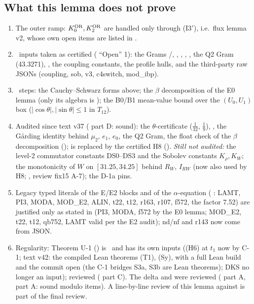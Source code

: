 \documentclass[11pt]{article}
\begin{document}
\subsection{What this lemma does not prove}\label{EI:sec:open}
\begin{enumerate}[leftmargin=*]
\item The outer ramp: $K_0^{\mathrm{OR}},K_2^{\mathrm{OR}}$ are handled only through (I3$'$), i.e.\ flux lemma v2, whose own open items are listed in .
\item \tR\ inputs taken as certified ( ``Open'' 1): the Grams /, , , , , the Q2 Gram (43.3271), , the coupling constants, the profile hulls, and the third-party raw JSONs (coupling, sob, v3, c4switch, mod\_ibp).
\item \tHd\ steps: the Cauchy--Schwarz forms above; the $\beta$ decomposition of the E0 lemma (only its algebra is \tS); the B0/B1 mean-value bound over the $(U_0,U_1)$ box ($|\cos\theta|,|\sin\theta|\le1$ in $T_{12}$).
\item Audited since text v37 ( part D: sound): the $\theta$-certificate ($\frac1{32}$, $\frac19$), , the G\aa rding identity behind $\mu_2$, $e_1$, $e_0$, the Q2 Gram, the float check of the $\beta$ decomposition ();  is replaced by the certified H8 (). \emph{Still not audited:} the level-2 commutator constants DS0--DS3 and the Sobolev constants $K_\rho,K_W$; the monotonicity of $W$ on $[31.25,34.25]$ behind $R_W$, $I_{RW}$ (now also used by H8; \tR, review fix15 A-7); the D-1a pins.
\item Legacy typed literals of the E/E2 blocks and of the $\alpha$-equation ( : LAMT, PI3, MODA, MOD\_E2, ALIN, t22, t12, r163, r107, f572, the factor 7.52) are justified only as stated in  (PI3, MODA, f572 by the E0 lemma; MOD\_E2, t22, t12, qb752, LAMT valid per the E2 audit); nd/nf and r143 now come from JSON.
\item Regularity: Theorem U-1 () is \tHd\ and has its own inputs ((H6) at $t_1$ now by C-1; text v42: the compiled Lean theorems (T1), (Sy), with a full Lean build and the commit open (the C-1 bridges S3a, S3b are Lean theorems); DKS no longer an input); reviewed ( part C). The  delta and  were reviewed ( part A,  part A: sound modulo items). A line-by-line review of this lemma against  is part of the final review.
\end{enumerate}

\ifdefined\stepmain\else
\end{document}
